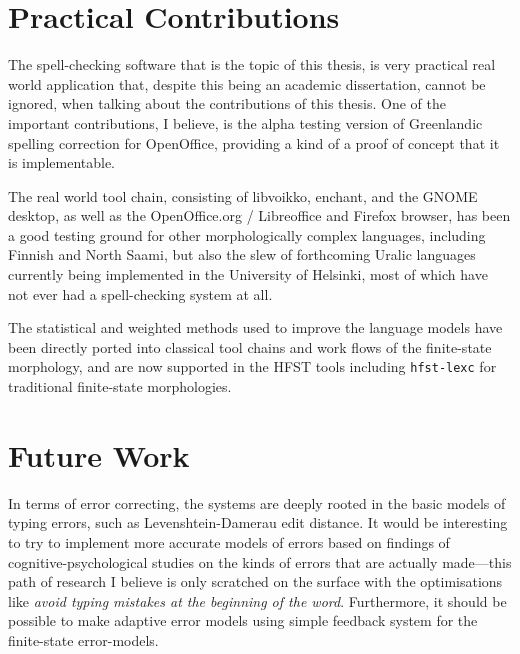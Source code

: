 \documentclass[officiallayout]{unihelcompling}
\begin{document}
\section{Practical Contributions}
\label{sec:practical-contributions}

The spell-checking software that is the topic of this thesis, is very
practical real world application that, despite this being an academic
dissertation, cannot be ignored, when talking about the contributions of this
thesis. One of the important contributions, I believe, is the alpha testing
version of Greenlandic spelling correction for OpenOffice, providing a kind of
a proof of concept that it is implementable.

The real world tool chain, consisting of libvoikko, enchant, and the GNOME
desktop, as well as the OpenOffice.org / Libreoffice and Firefox browser, has
been a good testing ground for other morphologically complex languages,
including Finnish and North Saami, but also the slew of forthcoming Uralic
languages currently being implemented in the University of Helsinki, most of
which have not ever had a spell-checking system at all. 

The statistical and weighted methods used to improve the language models have
been directly ported into classical tool chains and work flows of the 
finite-state morphology, and are now supported in the HFST tools including
\texttt{hfst-lexc} for traditional finite-state morphologies.

\section{Future Work}
\label{sec:future-work}

In terms of error correcting, the systems are deeply rooted in the basic models
of typing errors, such as Levenshtein-Damerau edit distance. It would be
interesting to try to implement more accurate models of errors based on
findings of cognitive-psychological studies on the kinds of errors that are
actually made---this path of research I believe is only scratched on the
surface with the optimisations like \emph{avoid typing mistakes at the
beginning of the word}. Furthermore, it should be possible to make adaptive
error models using simple feedback system for the finite-state error-models.
\end{document}
